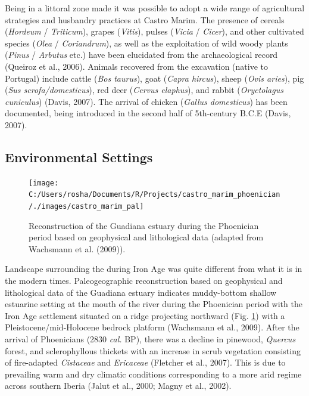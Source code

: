 \documentclass[review]{elsarticle} %
\begin{document}
Being in a littoral zone made it was possible to adopt a wide range of agricultural strategies and husbandry practices at Castro Marim. The presence of cereals (\emph{Hordeum} / \emph{Triticum}), grapes (\emph{Vitis}), pulses (\emph{Vicia} / \emph{Cicer}), and other cultivated species (\emph{Olea} / \emph{Coriandrum}), as well as the exploitation of wild woody plants (\emph{Pinus} / \emph{Arbutus} etc.) have been elucidated from the archaeological record (Queiroz et al., 2006). Animals recovered from the excavation (native to Portugal) include cattle (\emph{Bos taurus}), goat (\emph{Capra hircus}), sheep (\emph{Ovis aries}), pig (\emph{Sus scrofa/domesticus}), red deer (\emph{Cervus elaphus}), and rabbit (\emph{Oryctolagus cuniculus}) (Davis, 2007). The arrival of chicken (\emph{Gallus domesticus}) has been documented, being introduced in the second half of 5th-century B.C.E (Davis, 2007).

\hypertarget{environmental-settings}{%
\subsection{Environmental Settings}\label{environmental-settings}}



\begin{figure}

{\centering \texttt{[image: C:/Users/rosha/Documents/R/Projects/castro\_marim\_phoenician/./images/castro\_marim\_pal]} 

}

\caption{Reconstruction of the Guadiana estuary during the Phoenician period based on geophysical and lithological data (adapted from Wachsmann et al. (2009)).}\label{fig:castro-marim-pal}
\end{figure}

Landscape surrounding the during Iron Age was quite different from what it is in the modern times. Paleogeographic reconstruction based on geophysical and lithological data of the Guadiana estuary indicates muddy-bottom shallow estuarine setting at the mouth of the river during the Phoenician period with the Iron Age settlement situated on a ridge projecting northward (Fig. \ref{fig:castro-marim-pal}) with a Pleistocene/mid-Holocene bedrock platform (Wachsmann et al., 2009). After the arrival of Phoenicians (2830 \emph{cal.} BP), there was a decline in pinewood, \emph{Quercus} forest, and sclerophyllous thickets with an increase in scrub vegetation consisting of fire-adapted \emph{Cistaceae} and \emph{Ericaceae} (Fletcher et al., 2007). This is due to prevailing warm and dry climatic conditions corresponding to a more arid regime across southern Iberia (Jalut et al., 2000; Magny et al., 2002).
\end{document}
